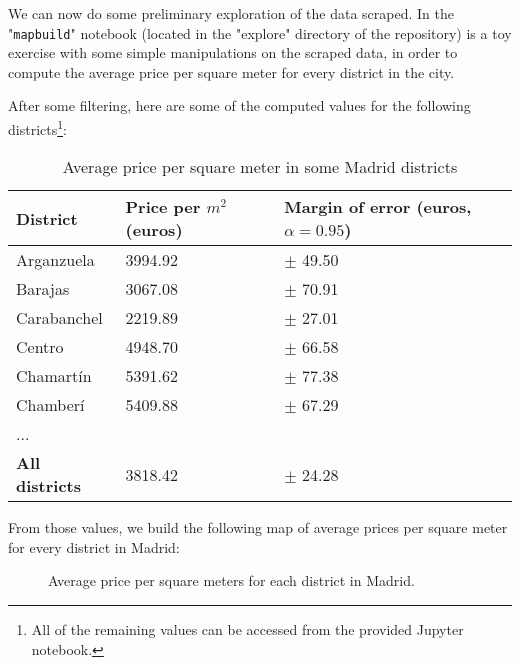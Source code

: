 \documentclass{article}
\newcommand{\ezskip}{\medskip\noindent}
\begin{document}
\begin{normalsize}
        We can now do some preliminary exploration of the data scraped. In the "\texttt{mapbuild}" notebook (located in the "explore" directory of the repository) is a toy exercise with some simple manipulations on the scraped data, in order to compute the average price per square meter for every district in the city. \ezskip
        
        After some filtering, here are some of the computed values for the following districts\footnote{All of the remaining values can be accessed from the provided Jupyter notebook.}:
        
        \ezskip

    	\begin{table}[h!]
          \begin{center}
            \label{tab:table4}
            \begin{tabular}{l|l|l}
                \textbf{District} & \textbf{Price per $m^2$ (euros)} & \textbf{Margin of error (euros, $\alpha = 0.95$)}\\ %
                \hline
                Arganzuela  & 3994.92  & $\pm$ 49.50 \\
                Barajas     & 3067.08  & $\pm$ 70.91 \\
                Carabanchel & 2219.89  & $\pm$ 27.01 \\
                Centro      & 4948.70  & $\pm$ 66.58 \\
                Chamartín   & 5391.62  & $\pm$ 77.38 \\
                Chamberí    & 5409.88  & $\pm$ 67.29 \\
                ...         &          &             \\
                \hline
                \textbf{All districts} & 3818.42 & $\pm$ 24.28  \\ %
            \end{tabular}
            \caption{Average price per square meter in some Madrid districts}
          \end{center}
        \end{table}
        
        From those values, we build the following map of average prices per square meter for every district in Madrid:
        
        \begin{figure}[htbp]
            \centering
            
            \caption{Average price per square meters for each district in Madrid.}
        \end{figure}
        

\end{normalsize}
\end{document}

